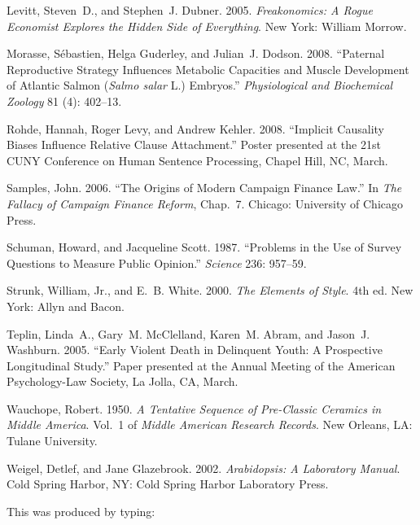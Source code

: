 \documentclass[]{interact}
\theoremstyle{plain}%
\theoremstyle{definition}
\theoremstyle{remark}
\begin{document}
\begin{thebibliography}{}
Levitt, Steven~D., and Stephen~J. Dubner. 2005. \emph{Freakonomics: A Rogue
 Economist Explores the Hidden Side of Everything}. New York: William Morrow.

Morasse, S{\'e}bastien, Helga Guderley, and Julian~J. Dodson. 2008. ``Paternal
 Reproductive Strategy Influences Metabolic Capacities and Muscle Development
 of Atlantic Salmon (\emph{Salmo salar} L.) Embryos.'' \emph{Physiological and
 Biochemical Zoology} 81 (4): 402--13.

Rohde, Hannah, Roger Levy, and Andrew Kehler. 2008. ``Implicit Causality Biases
 Influence Relative Clause Attachment.'' Poster presented at the 21st CUNY
 Conference on Human Sentence Processing, Chapel Hill, NC, March.

Samples, John. 2006. ``The Origins of Modern Campaign Finance Law.'' In
 \emph{The Fallacy of Campaign Finance Reform}, Chap.~7. Chicago: University of
 Chicago Press.

Schuman, Howard, and Jacqueline Scott. 1987. ``Problems in the Use of Survey
 Questions to Measure Public Opinion.'' \emph{Science} 236: 957--59.

Strunk, William, Jr., and E.~B. White. 2000. \emph{The Elements of Style}.
 4th ed. New York: Allyn and Bacon.

Teplin, Linda~A., Gary~M. McClelland, Karen~M. Abram, and Jason~J. Washburn.
 2005. ``Early Violent Death in Delinquent Youth: A Prospective Longitudinal
 Study.'' Paper presented at the Annual Meeting of the American Psychology-Law
 Society, La Jolla, CA, March.

Wauchope, Robert. 1950. \emph{A Tentative Sequence of Pre-Classic Ceramics in
 Middle America}. Vol.~1 of \emph{Middle American Research Records}. New
 Orleans, LA: Tulane University.

Weigel, Detlef, and Jane Glazebrook. 2002. \emph{\emph{Arabidopsis}: A
 Laboratory Manual}. Cold Spring Harbor, NY: Cold Spring Harbor Laboratory
 Press.

\end{thebibliography}
\bigskip
\noindent This was produced by typing:
\end{document}

